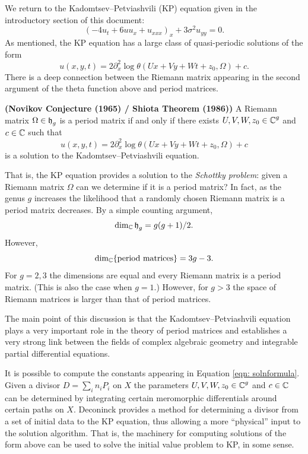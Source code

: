 We return to the Kadomtsev--Petviashvili (KP) equation given in the
introductory section of this document:
\begin{equation*}
    \left(-4u_t + 6uu_x + u_{xxx}\right)_x + 3\sigma^2 u_{yy} = 0.
\end{equation*}
As mentioned, the KP equation has a large class of quasi-periodic solutions of
the form
\begin{equation}\label{eqn: solnformula}
    u(x,y,t)
    =
    2 \partial_x^2 \log \theta(Ux + Vy + Wt + z_0, \Omega) + c.
\end{equation}
There is a deep connection between the Riemann matrix appearing in the
second argument of the theta function above and period matrices.
\begin{theorem}
  {\bf (Novikov Conjecture (1965) / Shiota Theorem (1986))}
  \cite{Shiota86} A Riemann matrix $\Omega \in \operatorname{\mathfrak{h}}_g$ is a period matrix
  if and only if there exists $U,V,W,z_0 \in \operatorname{\mathbb{C}}^g$ and $c \in \operatorname{\mathbb{C}}$ such
  that
  \[
      u(x,y,t)
      =
      2 \partial_x^2 \log \theta(Ux + Vy + Wt + z_0, \Omega) + c
  \]
  is a solution to the Kadomtsev--Petviashvili equation.
\end{theorem}
That is, the KP equation provides a solution to the {\it Schottky
  problem}: given a Riemann matrix $\Omega$ can we determine if it is a
period matrix? In fact, as the genus $g$ increases the likelihood that a
randomly chosen Riemann matrix is a period matrix decreases. By a simple
counting argument,
\[
    \dim_{\operatorname{\mathbb{C}}} \operatorname{\mathfrak{h}}_g = g(g+1)/2.
\]
However,
\[
    \dim_{\operatorname{\mathbb{C}}} \{ \text{period matrices} \} = 3g-3.
\]
For $g=2,3$ the dimensions are equal and every Riemann matrix is a
period matrix. (This is also the case when $g=1$.)  However, for $g > 3$
the space of Riemann matrices is larger than that of period matrices.

The main point of this discussion is that the Kadomtsev--Petviashvili
equation plays a very important role in the theory of period matrices
and establishes a very strong link between the fields of complex
algebraic geometry and integrable partial differential equations.

It is possible to compute the constants appearing in Equation
\eqref{eqn: solnformula}. Given a divisor $D = \sum_i n_i P_i$ on $X$
the parameters $U,V,W,z_0 \in \operatorname{\mathbb{C}}^g$ and $c \in \operatorname{\mathbb{C}}$ can be determined
by integrating certain meromorphic differentials around certain paths on
$X$. Deconinck \cite{DS98} provides a method for determining a divisor
from a set of initial data to the KP equation, thus allowing a more
``physical'' input to the solution algorithm. That is, the machinery for
computing solutions of the form above can be used to solve the initial
value problem to KP, in some sense.

